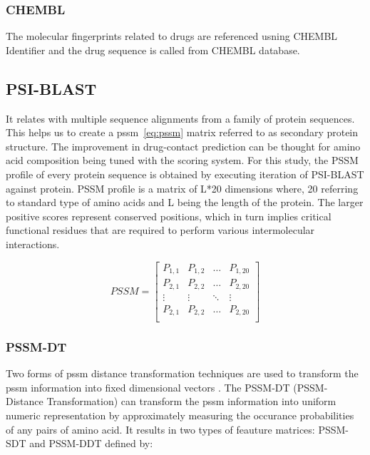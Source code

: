 \subsubsection{CHEMBL}
The molecular fingerprints related to drugs are referenced usning CHEMBL Identifier and the drug sequence is called from CHEMBL database. \cite{Gaulton2017}

\subsection{PSI-BLAST}
It relates with multiple sequence alignments from a family of protein sequences\cite{Schaffer2001}. This helps us to create a \acrshort{pssm}~\ref{eq:pssm} matrix referred to as secondary protein structure. The improvement in drug-contact prediction can be thought for amino acid composition being tuned with the scoring system. For this study, the PSSM profile of every protein sequence is obtained by executing iteration of PSI-BLAST against \cite[KEGG]{Schaffer2001} protein. PSSM profile is a matrix of L*20 dimensions where, 20 referring to standard type of amino acids and L being the length of the protein. The larger positive scores represent conserved positions, which in turn implies critical functional residues that are required to perform various intermolecular interactions.\cite[PSSM]{Schaffer2001}

\begin{equation}
  PSSM = \begin{bmatrix}
    P_{1,1} & P_{1,2} & \dots & P_{1,20} \\
    P_{2,1} & P_{2,2} & \dots & P_{2,20} \\
    \vdots  & \vdots  & \ddots & \vdots \\
    P_{2,1} & P_{2,2} & \dots & P_{2,20} \\
  \end{bmatrix}
  \label{eq:pssm}
\end{equation}

\subsubsection{PSSM-DT}
Two forms of \acrshort{pssm} distance transformation techniques are used to transform the \acrshort{pssm} information into fixed dimensional vectors \cite{Xu2015}. The PSSM-DT (PSSM-Distance Transformation) can transform the \acrshort{pssm} information into uniform numeric representation by approximately measuring the occurance probabilities of any pairs of amino acid. It results in two types of feauture matrices: PSSM-SDT and PSSM-DDT defined by:

